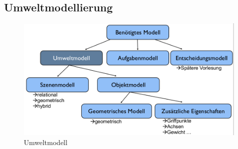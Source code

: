 \subsection{Umweltmodellierung}
\begin{figure}[ht]\centering 
\includegraphics[width=0.6\linewidth]{figures/ch02_umweltmodell.png}
\caption{Umweltmodell}
\label{fig:ch02_um}
\end{figure}


